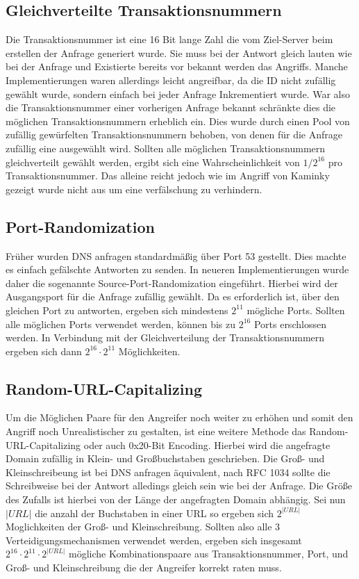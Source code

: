 \documentclass[10pt,a4paper]{article}
\begin{document}
\subsection*{Gleichverteilte Transaktionsnummern}
Die Transaktionsnummer ist eine 16 Bit lange Zahl die vom Ziel-Server beim erstellen der Anfrage generiert wurde. Sie muss bei der Antwort gleich lauten wie bei der Anfrage und Existierte bereits vor bekannt werden das Angriffs. Manche Implementierungen waren allerdings leicht angreifbar, da die ID nicht zufällig gewählt wurde, sondern einfach bei jeder Anfrage Inkrementiert wurde. War also die Transaktionsnummer einer vorherigen Anfrage bekannt schränkte dies die möglichen Transaktionsnummern erheblich ein. Dies wurde durch einen Pool von zufällig gewürfelten Transaktionsnummern behoben, von denen für die Anfrage zufällig eine ausgewählt wird. Sollten alle möglichen Transaktionsnummern gleichverteilt gewählt werden, ergibt sich eine Wahrscheinlichkeit von $1/2^{16}$ pro Transaktionsnummer. Das alleine reicht jedoch wie im Angriff von Kaminky gezeigt wurde nicht aus um eine verfälschung zu verhindern. 

\subsection*{Port-Randomization}
Früher wurden DNS anfragen standardmäßig über Port 53 gestellt. Dies machte es einfach gefälschte Antworten zu senden. In neueren Implementierungen wurde daher die sogenannte Source-Port-Randomization eingeführt. Hierbei wird der Ausgangsport für die Anfrage zufällig gewählt. Da es erforderlich ist, über den gleichen Port zu antworten, ergeben sich mindestens $2^{11}$ mögliche Ports. Sollten alle möglichen Ports verwendet werden, können bis zu $2^{16}$ Ports erschlossen werden. In Verbindung mit der Gleichverteilung der Transaktionsnummern ergeben sich dann $2^{16} \cdot 2^{11}$ Möglichkeiten.

\subsection*{Random-URL-Capitalizing}
Um die Möglichen Paare für den Angreifer noch weiter zu erhöhen und somit den Angriff noch Unrealistischer zu gestalten, ist eine weitere Methode das Random-URL-Capitalizing oder auch 0x20-Bit Encoding. Hierbei wird die angefragte Domain zufällig in Klein- und Großbuchstaben geschrieben. Die Groß- und Kleinschreibeung ist bei DNS anfragen äquivalent, nach RFC 1034 sollte die Schreibweise bei der Antwort alledings gleich sein wie bei der Anfrage. Die Größe des Zufalls ist hierbei von der Länge der angefragten Domain abhängig. Sei nun $|\mathit{URL}|$ die anzahl der Buchstaben in einer URL so ergeben sich $2^{|URL|}$ Moglichkeiten der Groß- und Kleinschreibung. Sollten also alle 3 Verteidigungsmechanismen verwendet werden, ergeben sich insgesamt $2^{16} \cdot 2^{11} \cdot 2^{|URL|}$ mögliche Kombinationspaare aus Transaktionsnummer, Port, und Groß- und Kleinschreibung die der Angreifer korrekt raten muss.



\end{document}
